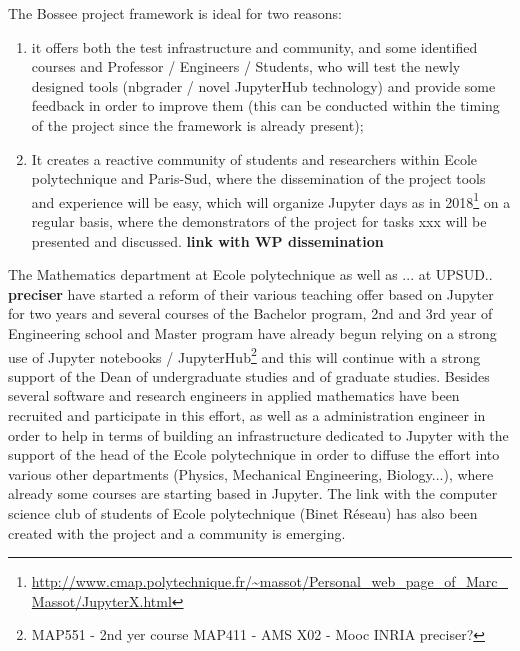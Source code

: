 \begin{task}[
  title=Teaching with Jupyter technology,
  id=teaching,
  lead=EP,
  PM=8, %
  wphases={0-48},
  partners={EP,UPSUD}
  ]

  The Bossee project framework is ideal for two reasons:
  
  \begin{enumerate}
    \item it offers both the test infrastructure and community, and some identified courses and
  Professor / Engineers / Students, who will test the newly designed tools
  (nbgrader / novel JupyterHub technology) and provide some feedback in order to
  improve them (this can be conducted within the timing of the project since the
  framework is already present);
    \item It creates a reactive community of students
  and researchers within Ecole polytechnique and Paris-Sud, where the
  dissemination of the project tools and experience will be easy, which will
  organize Jupyter days as in 2018\footnote{\url{http://www.cmap.polytechnique.fr/~massot/Personal_web_page_of_Marc_Massot/JupyterX.html}} on a regular basis, where the demonstrators of the
  project for tasks xxx will be presented and discussed. {\bf link with WP
    dissemination}
  \end{enumerate}

  The Mathematics department at Ecole polytechnique as well as ... at UPSUD..
  {\bf preciser} have started a reform of their various teaching offer based on
  Jupyter for two years and several courses of the Bachelor program, 2nd and 3rd
  year of Engineering school and Master program have already begun relying on a
  strong use of Jupyter notebooks / JupyterHub\footnote{MAP551 - 2nd yer course
  MAP411 - AMS X02 - Mooc INRIA preciser?} and this will continue with a strong
  support of the Dean of undergraduate studies and of graduate studies. Besides
  several software and research engineers in applied mathematics have been
  recruited and participate in this effort, as well as a administration engineer
  in order to help in terms of building an infrastructure dedicated to Jupyter
  with the support of the head of the Ecole polytechnique in order to diffuse
  the effort into various other departments (Physics, Mechanical Engineering,
  Biology...), where already some courses are starting based in Jupyter. The
  link with the computer science club of students of Ecole polytechnique (Binet
  R\'eseau) has also been created with the project and a community is emerging.


\end{task}

